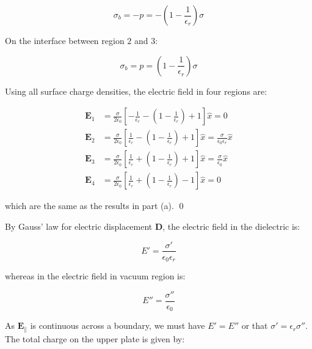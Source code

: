 \documentclass[12pt]{article}
\begin{document}
\begin{equation}
    \sigma_{b} = -p = -\left( 1 - \frac{1}{\epsilon_{r}} \right) \sigma
\end{equation}

On the interface between region $2$ and $3$:

\begin{equation}
    \sigma_{b} = p = \left( 1 - \frac{1}{\epsilon_{r}} \right) \sigma
\end{equation}

Using all surface charge densities, the electric field in four regions are:

\begin{equation}
\begin{split}
    \mathbf{E}_{1} &= \frac{\sigma}{2\epsilon_{0}} \left[ -\frac{1}{\epsilon_{r}} - \left( 1 - \frac{1}{\epsilon_{r}} \right) + 1 \right] \hat{x} = 0 \\
    \mathbf{E}_{2} &= \frac{\sigma}{2\epsilon_{0}} \left[ \frac{1}{\epsilon_{r}} - \left( 1 - \frac{1}{\epsilon_{r}} \right) + 1 \right] \hat{x} = \frac{\sigma}{\epsilon_{0}\epsilon_{r}} \hat{x} \\
    \mathbf{E}_{3} &= \frac{\sigma}{2\epsilon_{0}} \left[ \frac{1}{\epsilon_{r}} + \left( 1 - \frac{1}{\epsilon_{r}} \right) + 1 \right] \hat{x} = \frac{\sigma}{\epsilon_{0}} \hat{x} \\
    \mathbf{E}_{4} &= \frac{\sigma}{2\epsilon_{0}} \left[ \frac{1}{\epsilon_{r}} + \left( 1 - \frac{1}{\epsilon_{r}} \right) - 1 \right] \hat{x} = 0
\end{split}
\end{equation}

which are the same as the results in part (a).
\qed



By Gauss' law for electric displacement $\mathbf{D}$, the electric field in the dielectric is:

\begin{equation}
    E' = \frac{\sigma'}{\epsilon_{0} \epsilon_{r}}
\end{equation}

whereas in the electric field in vacuum region is:

\begin{equation}
    E'' = \frac{\sigma''}{\epsilon_{0}}
\end{equation}

As $\mathbf{E}_{\parallel}$ is continuous across a boundary, we must have $E' = E''$ or that $\sigma' = \epsilon_{r} \sigma''$. The total charge on the upper plate is given by:
\end{document}
